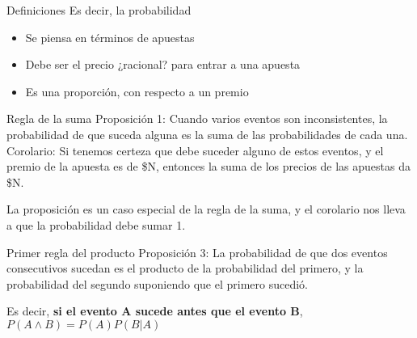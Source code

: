 \documentclass{beamer}
\begin{document}
\begin{frame}{Definiciones}
	Es decir, la probabilidad
	\begin{itemize}
		\item Se piensa en términos de apuestas
		\item Debe ser el precio ¿racional? para entrar a una apuesta
		\item Es una proporción, con respecto a un premio
	\end{itemize}
\end{frame}

\begin{frame}{Regla de la suma}
	Proposición 1: Cuando varios eventos son inconsistentes, la probabilidad de que suceda alguna es la suma de las probabilidades de cada una.
	Corolario: Si tenemos certeza que debe suceder alguno de estos eventos, y el premio de la apuesta es de \$N, entonces la suma de los precios de las apuestas da \$N.

	La proposición es un caso especial de la regla de la suma, y el corolario nos lleva a que la probabilidad debe sumar 1.
\end{frame}

\begin{frame}{Primer regla del producto}
	Proposición 3: La probabilidad de que dos eventos consecutivos sucedan es el producto de la probabilidad del primero, y la probabilidad del segundo suponiendo que el primero sucedió.

	Es decir, \textbf{si el evento A sucede antes que el evento B}, $P(A \land B) = P(A) P(B|A)$
\end{frame}
\end{document}
